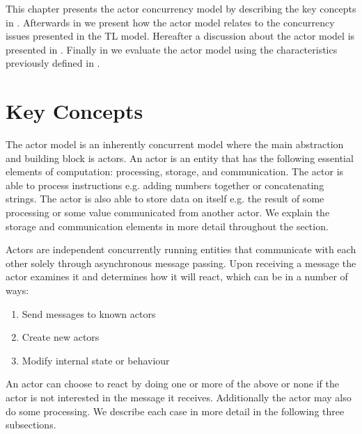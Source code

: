 \makeatletter {}\makeatother
{}
This chapter presents the actor concurrency model by describing the key concepts in . Afterwards in  we present how the actor model relates to the concurrency issues presented in the \ac{TL} model. Hereafter a discussion about the actor model is presented in . Finally in  we evaluate the actor model using the characteristics previously defined in .
\label{chap:actor}

\section{Key Concepts}\label{sec:actor_concepts}
The actor model is an inherently concurrent model where the main abstraction and building block is actors\cite[p. 2]{karmani2009actor}. An actor is an entity that has the following essential elements of computation\cite{actorLangNextVideo}: processing, storage, and communication. The actor is able to process instructions e.g. adding numbers together or concatenating strings. The actor is also able to store data on itself e.g. the result of some processing or some value communicated from another actor. We explain the storage and communication elements in more detail throughout the section.

Actors are independent concurrently running entities that communicate with each other solely through asynchronous message passing\cite[p. 304]{tasharofi2013scala}. Upon receiving a message the actor examines it and determines how it will react, which can be in a number of ways\cite[p. 2]{hewitt2014actor}:
\begin{enumerate}
\item Send messages to known actors
\item Create new actors
\item Modify internal state or behaviour
\end{enumerate}
An actor can choose to react by doing one or more of the above or none if the actor is not interested in the message it receives. Additionally the actor may also do some processing. We describe each case in more detail in the following three subsections.

